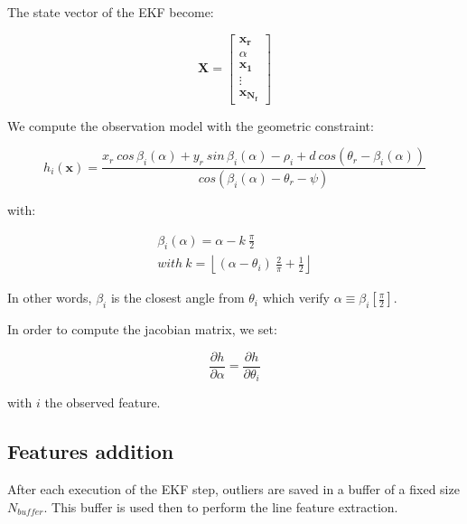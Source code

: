 \documentclass[a4paper,12pt]{article}
\begin{document}

The state vector of the EKF become:

\begin{equation}
\mathbf{X} = 
\left [
\begin{array}{c}
\mathbf{x_r}\\ 
\alpha\\ 
\mathbf{x_1}\\
\vdots \\  
\mathbf{x_{N_f}}
\end{array}
\right ]
\end{equation}

We compute the observation model with the geometric constraint:

\begin{equation}
h_i(\mathbf{x}) =\frac{ x_r \: cos \, \beta_i(\alpha) + y_r \: sin \, \beta_i(\alpha) - \rho_i + d\: cos(\theta_r-\beta_i(\alpha))}{cos(\beta_i(\alpha)-\theta_r-\psi)} 
\end{equation}

with:

\begin{equation}
\begin{array}{l}
\beta_i(\alpha) = \alpha - k \: \frac{\pi}{2}\\
\mathit{with } \: k = \left \lfloor (\alpha-\theta_i) \: \frac{2 }{\pi} +\frac{1}{2} \right \rfloor
\end{array}
\end{equation}

In other words, $\beta_i$ is the closest angle from $\theta_i$ which verify $\alpha \equiv \beta_i \left [ \frac{\pi}{2} \right ]$.

In order to compute the jacobian matrix, we set:

\begin{equation}
\frac{\partial h}{\partial \alpha} = \frac{\partial h}{\partial \theta_i}
\end{equation}

with $i$ the observed feature.

\subsection{Features addition}
\label{sec:features}

After each execution of the EKF step, outliers are saved in a buffer of a fixed size $N_{buffer}$.
This buffer is used then to perform the line feature extraction.
\end{document}
